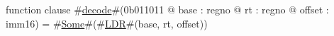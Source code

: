 function clause #\hyperref[zdecode]{decode}#(0b011011 @ base : regno @ rt : regno @ offset : imm16) =
  #\hyperref[zSome]{Some}#(#\hyperref[zLDR]{LDR}#(base, rt, offset))
